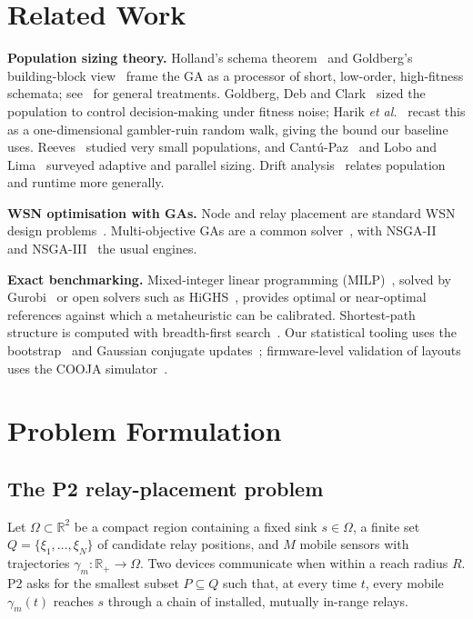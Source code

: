\documentclass[conference]{IEEEtran}
\newcommand{\Real}{\mathbb{R}}
\begin{document}
\section{Related Work}
\label{sec:related}
\textbf{Population sizing theory.} Holland's schema
theorem~\cite{holland1975adaptation} and Goldberg's building-block
view~\cite{goldberg1989ga,goldberg2002design} frame the GA as a processor of
short, low-order, high-fitness schemata; see~\cite{mitchell1996introduction,
eiben2003introduction} for general treatments. Goldberg, Deb and
Clark~\cite{goldberg1992sizing} sized the population to control decision-making
under fitness noise; Harik \emph{et al.}~\cite{harik1999gambler} recast this as a
one-dimensional gambler-ruin random walk, giving the bound our baseline uses.
Reeves~\cite{reeves1993small} studied very small populations, and
Cant\'u-Paz~\cite{cantupaz2000parallel} and Lobo and
Lima~\cite{harik1999elitist} surveyed adaptive and parallel sizing. Drift
analysis~\cite{he2001drift} relates population and runtime more generally.

\textbf{WSN optimisation with GAs.} Node and relay placement are standard WSN
design problems~\cite{younis2008placement,cheng2008relay}. Multi-objective GAs
are a common solver~\cite{konak2006multiobjective,jourdan2004layout}, with
NSGA-II~\cite{deb2002nsga2} and NSGA-III~\cite{deb2014nsga3} the usual engines.

\textbf{Exact benchmarking.} Mixed-integer linear programming
(MILP)~\cite{wolsey1998integer}, solved by Gurobi~\cite{gurobi2024} or open
solvers such as HiGHS~\cite{huangfu2018highs}, provides optimal or near-optimal
references against which a metaheuristic can be calibrated. Shortest-path
structure is computed with breadth-first search~\cite{cormen2009algorithms}.
Our statistical tooling uses the bootstrap~\cite{efron1993bootstrap} and
Gaussian conjugate updates~\cite{gelman2013bayesian}; firmware-level validation
of layouts uses the COOJA simulator~\cite{osterlind2006cooja}.

\section{Problem Formulation}
\label{sec:problem}
\subsection{The P2 relay-placement problem}
Let $\Omega\subset\Real^2$ be a compact region containing a fixed sink
$s\in\Omega$, a finite set $Q=\{\xi_1,\dots,\xi_N\}$ of candidate relay
positions, and $M$ mobile sensors with trajectories
$\gamma_m:\Real_+\!\to\Omega$. Two devices communicate when within a reach
radius $R$. P2 asks for the smallest subset $P\subseteq Q$ such that, at every
time $t$, every mobile $\gamma_m(t)$ reaches $s$ through a chain of installed,
mutually in-range relays.
\end{document}
